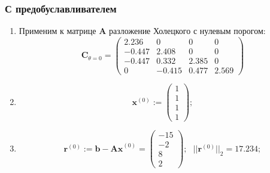 \subsubsection{С предобуславливателем}

\begin{enumerate}
    \item Применим к матрице $\mathbf{A}$ разложение Холецкого с нулевым порогом:
    \begin{equation}
        \mathbf{C}_{\theta=0} = \begin{pmatrix}
            2.236  & 0      & 0     & 0     \\
            -0.447 & 2.408  & 0     & 0     \\
            -0.447 & 0.332  & 2.385 & 0     \\
            0      & -0.415 & 0.477 & 2.569
        \end{pmatrix}
    \end{equation}

    \item $$\mathbf{x}^{(0)} :=
    \begin{pmatrix} 1\\ 1\\ 1\\ 1 \end{pmatrix};$$

    \item $$\mathbf{r}^{(0)} :=
    \mathbf{b-Ax}^{(0)} = \begin{pmatrix} -15\\ -2\\ 8 \\ 2 \end{pmatrix}; ~~~
    ||\mathbf{r}^{(0)}||_2 = \mathbf{17.234};$$


\end{enumerate}
